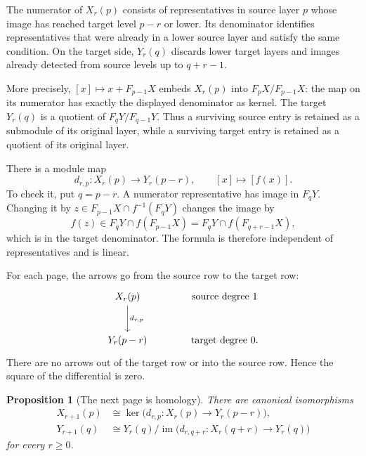 \documentclass[11pt]{article}
\newtheorem{proposition}[theorem]{Proposition}
\theoremstyle{definition}
\theoremstyle{remark}\newtheorem{remark}[theorem]{Remark}
\DeclareMathOperator{\Ker}{ker}
\DeclareMathOperator{\im}{im}
\begin{document}
The numerator of $X_r(p)$ consists of representatives in source layer $p$
whose image has reached target level $p-r$ or lower. Its denominator
identifies representatives that were already in a lower source layer
and satisfy the same condition. On the target side, $Y_r(q)$ discards
lower target layers and images already detected from source levels up
to $q+r-1$.

More precisely, $[x]\mapsto x+F_{p-1}X$ embeds $X_r(p)$ into
$F_pX/F_{p-1}X$: the map on its numerator has exactly the displayed
denominator as kernel.
The target $Y_r(q)$ is a quotient of $F_qY/F_{q-1}Y$. Thus a surviving
source entry is retained as a submodule of its original layer, while a
surviving target entry is retained as a quotient of its original layer.

There is a module map
\begin{equation}\label{s:page-differential}
d_{r,p}:X_r(p)\longrightarrow Y_r(p-r),\qquad[x]\longmapsto[f(x)].
\end{equation}
To check it, put $q=p-r$. A numerator representative has image in $F_qY$.
Changing it by
$z\in F_{p-1}X\cap f^{-1}(F_qY)$ changes the image by
\[
f(z)\in F_qY\cap f(F_{p-1}X)
       =F_qY\cap f(F_{q+r-1}X),
\]
which is in the target denominator. The formula is therefore independent
of representatives and is linear.

For each page, the arrows go from the source row to the target row:
\[
\begin{tikzcd}[column sep=large,row sep=large]
X_r(p) \arrow[d,"d_{r,p}"] & \text{source degree }1\\
Y_r(p-r) & \text{target degree }0.
\end{tikzcd}
\]
There are no arrows out of the target row or into the source row. Hence
the square of the differential is zero.

\begin{proposition}[The next page is homology]\label{s:transition}
There are canonical isomorphisms
\begin{align*}
X_{r+1}(p)&\cong\Ker\bigl(d_{r,p}:X_r(p)\to Y_r(p-r)\bigr),\\
Y_{r+1}(q)&\cong
Y_r(q)/\im\bigl(d_{r,q+r}:X_r(q+r)\to Y_r(q)\bigr)
\end{align*}
for every $r\geq0$.
\end{proposition}
\end{document}
